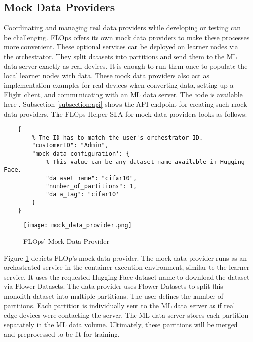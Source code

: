 \subsection{Mock Data Providers}

Coordinating and managing real data providers while developing or testing can be challenging.
FLOps offers its own mock data providers to make these processes more convenient.
These optional services can be deployed on learner nodes via the orchestrator.
They split datasets into partitions and send them to the ML data server exactly as real devices.
It is enough to run them once to populate the local learner nodes with data.
These mock data providers also act as implementation examples for real devices when converting data, setting up a Flight client, and communicating with an ML data server.
The code is available here \cite{flops_code}.
Subsection \ref{subsection:api} shows the API endpoint for creating such mock data providers.
The FLOps Helper SLA for mock data providers looks as follows:
\begin{lstlisting}
    {
        % The ID has to match the user's orchestrator ID.
        "customerID": "Admin",
        "mock_data_configuration": {
            % This value can be any dataset name available in Hugging Face.
            "dataset_name": "cifar10",
            "number_of_partitions": 1,
            "data_tag": "cifar10"
        }
    }
\end{lstlisting}
\begin{figure}[h]
    \begin{adjustwidth}{-0.1\paperwidth}{-0.1\paperwidth}
        \centering
        \texttt{[image: mock\_data\_provider.png]}
        \caption{FLOps' Mock Data Provider}
        \label{fig:mock_data_provider}
    \end{adjustwidth}
\end{figure}
Figure \ref{fig:mock_data_provider} depicts FLOp's mock data provider.
The mock data provider runs as an orchestrated service in the container execution environment, similar to the learner service.
It uses the requested Hugging Face dataset name to download the dataset via Flower Datasets.
The data provider uses Flower Datasets to split this monolith dataset into multiple partitions.
The user defines the number of partitions.
Each partition is individually sent to the ML data server as if real edge devices were contacting the server.
The ML data server stores each partition separately in the ML data volume.
Ultimately, these partitions will be merged and preprocessed to be fit for training.
